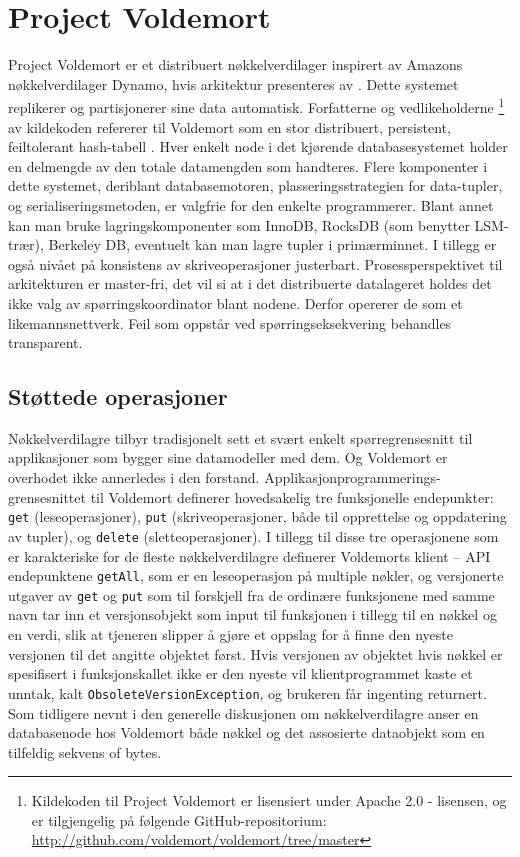 \section{Project Voldemort}

Project Voldemort er et distribuert nøkkelverdilager inspirert av Amazons nøkkelverdilager Dynamo, hvis arkitektur presenteres av \cite{decandia2007}. Dette systemet replikerer og partisjonerer sine data automatisk. Forfatterne og vedlikeholderne \footnote{Kildekoden til Project Voldemort er lisensiert under Apache 2.0 - lisensen, og er tilgjengelig på følgende GitHub-repositorium: \url{http://github.com/voldemort/voldemort/tree/master}} av kildekoden refererer til Voldemort som en stor distribuert, persistent, feiltolerant hash-tabell \citep{kreps2009}. Hver enkelt node i det kjørende databasesystemet holder en delmengde av den totale datamengden som handteres. Flere komponenter i dette systemet, deriblant databasemotoren, plasseringsstrategien for data-tupler, og serialiseringsmetoden, er valgfrie for den enkelte programmerer. Blant annet kan man bruke lagringskomponenter som InnoDB, RocksDB (som benytter LSM-trær), Berkeley DB, eventuelt kan man lagre tupler i primærminnet. I tillegg er også nivået på konsistens av skriveoperasjoner justerbart. Prosessperspektivet til arkitekturen er master-fri, det vil si at i det distribuerte datalageret holdes det ikke valg av spørringskoordinator blant nodene. Derfor opererer de som et likemannsnettverk. Feil som oppstår ved spørringseksekvering behandles transparent.

\subsection{Støttede operasjoner}
Nøkkelverdilagre tilbyr tradisjonelt sett et svært enkelt spørregrensesnitt til applikasjoner som bygger sine datamodeller med dem. Og Voldemort er overhodet ikke annerledes i den forstand. Applikasjonprogrammerings-grensesnittet til Voldemort definerer hovedsakelig tre funksjonelle endepunkter: \texttt{get} (leseoperasjoner), \texttt{put} (skriveoperasjoner, både til opprettelse og oppdatering av tupler), og \texttt{delete} (sletteoperasjoner). I tillegg til disse tre operasjonene som er karakteriske for de fleste nøkkelverdilagre definerer Voldemorts klient – API endepunktene \texttt{getAll}, som er en leseoperasjon på multiple nøkler, og versjonerte utgaver av \texttt{get} og \texttt{put} som til forskjell fra de ordinære funksjonene med samme navn tar inn et versjonsobjekt som input til funksjonen i tillegg til en nøkkel og en verdi, slik at tjeneren slipper å gjøre et oppslag for å finne den nyeste versjonen til det angitte objektet først. Hvis versjonen av objektet hvis nøkkel er spesifisert i funksjonskallet ikke er den nyeste vil klientprogrammet kaste et unntak, kalt \texttt{ObsoleteVersionException}, og brukeren får ingenting returnert. Som tidligere nevnt i den generelle diskusjonen om nøkkelverdilagre anser en databasenode hos Voldemort både nøkkel og det assosierte dataobjekt som en tilfeldig sekvens of bytes. %

